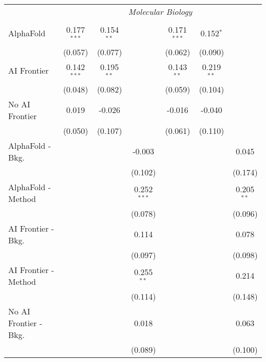 \begin{tabular}{lcccccc}
 & \multicolumn{6}{c}{\textit{Molecular Biology}} \\ \\
   AlphaFold               & 0.177$^{***}$ & 0.154$^{**}$ &               & 0.171$^{***}$ & 0.152$^{*}$  &   \\   
                           & (0.057)       & (0.077)      &               & (0.062)       & (0.090)      &   \\   
   AI Frontier             & 0.142$^{***}$ & 0.195$^{**}$ &               & 0.143$^{**}$  & 0.219$^{**}$ &   \\   
                           & (0.048)       & (0.082)      &               & (0.059)       & (0.104)      &   \\   
   No AI Frontier          & 0.019         & -0.026       &               & -0.016        & -0.040       &   \\   
                           & (0.050)       & (0.107)      &               & (0.061)       & (0.110)      &   \\   
   AlphaFold - Bkg.        &               &              & -0.003        &               &              & 0.045\\   
                           &               &              & (0.102)       &               &              & (0.174)\\   
   AlphaFold - Method      &               &              & 0.252$^{***}$ &               &              & 0.205$^{**}$\\   
                           &               &              & (0.078)       &               &              & (0.096)\\   
   AI Frontier - Bkg.      &               &              & 0.114         &               &              & 0.078\\   
                           &               &              & (0.097)       &               &              & (0.098)\\   
   AI Frontier - Method    &               &              & 0.255$^{**}$  &               &              & 0.214\\   
                           &               &              & (0.114)       &               &              & (0.148)\\   
   No AI Frontier - Bkg.   &               &              & 0.018         &               &              & 0.063\\   
                           &               &              & (0.089)       &               &              & (0.100)\\   

\end{tabular}
